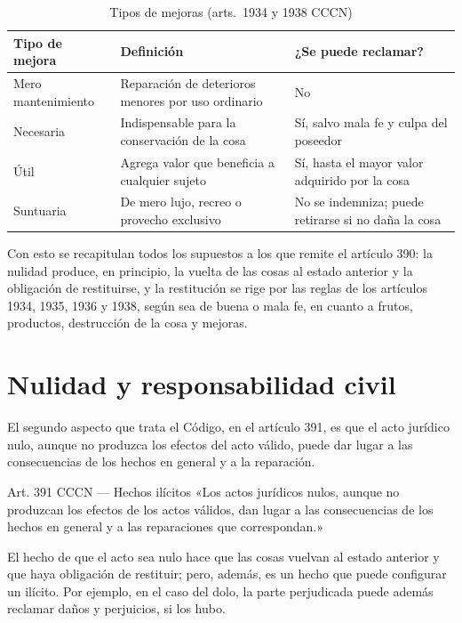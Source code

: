 \documentclass[12pt,oneside]{book}
\begin{document}
\begin{table}[H]
\centering
\caption{Tipos de mejoras (arts.~1934 y 1938 CCCN)}
\begin{tabularx}{\textwidth}{
    >{\raggedright\arraybackslash}p{}
    >{\raggedright\arraybackslash}X
    >{\raggedright\arraybackslash}X
}
\toprule
\textbf{Tipo de mejora} & \textbf{Definición} & \textbf{¿Se puede reclamar?} \\
\midrule
Mero mantenimiento & Reparación de deterioros menores por uso ordinario & No \\
\addlinespace
Necesaria & Indispensable para la conservación de la cosa & Sí, salvo mala fe y culpa del poseedor \\
\addlinespace
Útil & Agrega valor que beneficia a cualquier sujeto & Sí, hasta el mayor valor adquirido por la cosa \\
\addlinespace
Suntuaria & De mero lujo, recreo o provecho exclusivo & No se indemniza; puede retirarse si no daña la cosa \\
\bottomrule
\end{tabularx}
\end{table}

Con esto se recapitulan todos los supuestos a los que remite el artículo 390: la nulidad produce, en principio, la vuelta de las cosas al estado anterior y la obligación de restituirse, y la restitución se rige por las reglas de los artículos 1934, 1935, 1936 y 1938, según sea de buena o mala fe, en cuanto a frutos, productos, destrucción de la cosa y mejoras.

\section{Nulidad y responsabilidad civil}
\label{sec:responsabilidad}

El segundo aspecto que trata el Código, en el artículo 391, es que el acto jurídico nulo, aunque no produzca los efectos del acto válido, puede dar lugar a las consecuencias de los hechos en general y a la reparación.

\begin{articulo}{Art. 391 CCCN --- Hechos ilícitos}
«Los actos jurídicos nulos, aunque no produzcan los efectos de los actos válidos, dan lugar a las consecuencias de los hechos en general y a las reparaciones que correspondan.»
\end{articulo}

El hecho de que el acto sea nulo hace que las cosas vuelvan al estado anterior y que haya obligación de restituir; pero, además, es un hecho que puede configurar un ilícito. Por ejemplo, en el caso del dolo, la parte perjudicada puede además reclamar daños y perjuicios, si los hubo.
\end{document}
